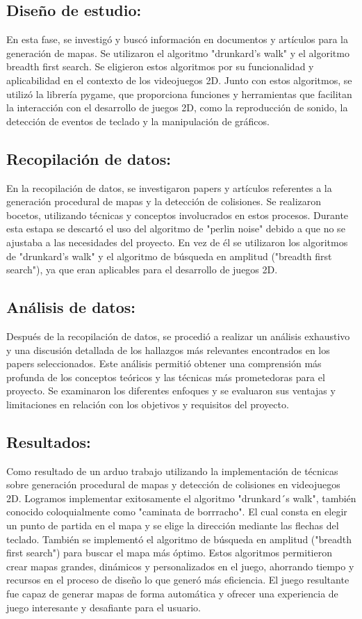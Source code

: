 \documentclass[stu, 12pt, letterpaper, donotrepeattitle, floatsintext, natbib]{apa7}
\begin{document}
\subsection{Diseño de estudio:}
En esta fase, se investigó y buscó información en documentos y artículos para la generación de mapas. Se utilizaron el algoritmo "drunkard's walk" y el algoritmo breadth first search.
Se eligieron estos algoritmos por su funcionalidad y aplicabilidad en el contexto de los videojuegos 2D. Junto con estos algoritmos, se utilizó la librería pygame, que proporciona funciones y herramientas que facilitan la interacción con el desarrollo de juegos 2D, como la reproducción de sonido, la detección de eventos de teclado y la manipulación de gráficos.
\subsection{Recopilación de datos:}
En la recopilación de datos, se investigaron papers y artículos referentes a la generación procedural de mapas y la detección de colisiones. Se realizaron bocetos, utilizando técnicas y conceptos involucrados en estos procesos. Durante esta estapa se descartó el uso del algoritmo de "perlin noise" debido a que no se ajustaba a las necesidades del proyecto. En vez de él se utilizaron  los algoritmos de "drunkard's walk" y el algoritmo de búsqueda en amplitud ("breadth first search"), ya que eran aplicables para el desarrollo de juegos 2D.
\subsection{Análisis de datos:}
Después de la recopilación de datos, se procedió a realizar un análisis exhaustivo y una discusión detallada de los hallazgos más relevantes encontrados en los papers seleccionados. Este análisis permitió obtener una comprensión más profunda de los conceptos teóricos y las técnicas más prometedoras para el proyecto. Se examinaron los diferentes enfoques y se evaluaron sus ventajas y limitaciones en relación con los objetivos y requisitos del proyecto.
\subsection{Resultados:}
Como resultado de un arduo trabajo utilizando la implementación de técnicas sobre generación procedural de mapas y detección de colisiones en videojuegos 2D.
Logramos implementar exitosamente el algoritmo "drunkard´s walk", también conocido coloquialmente como "caminata de borrracho". El cual consta en elegir un punto de partida en el mapa y se elige la dirección mediante las flechas del teclado.  
También se implementó el algoritmo de búsqueda en amplitud ("breadth first search") para buscar el mapa más óptimo. Estos algoritmos permitieron crear mapas grandes, dinámicos y personalizados en el juego, ahorrando tiempo y recursos en el proceso de diseño lo que generó más eficiencia. El juego resultante fue capaz de generar mapas de forma automática y ofrecer una experiencia de juego interesante y desafiante para el usuario.
\end{document}
